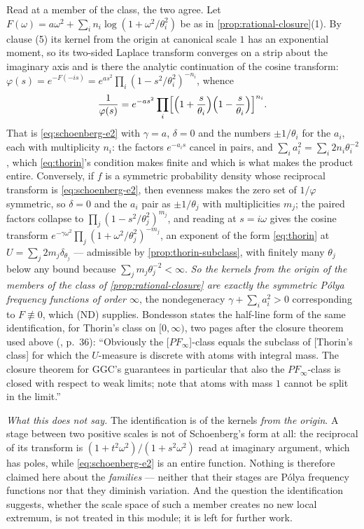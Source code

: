 \begin{remark}
Read at a member of the class, the two agree. Let $F(\omega) = a\omega^2 +
\sum_i n_i\log(1 + \omega^2/\theta_i^2)$ be as in \ref{prop:rational-closure}(1). By clause (5)
its kernel from the origin at canonical scale $1$ has an exponential moment, so its two-sided
Laplace transform converges on a strip about the imaginary axis and is there the analytic
continuation of the cosine transform: $\varphi(s) = e^{-F(-is)} = e^{as^2}\prod_i
(1 - s^2/\theta_i^2)^{-n_i}$, whence
\[
  \frac{1}{\varphi(s)}
   = e^{-as^2}\prod_i\Bigl[\Bigl(1 + \frac{s}{\theta_i}\Bigr)
       \Bigl(1 - \frac{s}{\theta_i}\Bigr)\Bigr]^{n_i} .
\]
That is \ref{eq:schoenberg-e2} with $\gamma = a$, $\delta = 0$ and the numbers $\pm1/\theta_i$ for
the $a_i$, each with multiplicity $n_i$: the factors $e^{-a_is}$ cancel in pairs, and
$\sum_i a_i^2 = \sum_i 2n_i\theta_i^{-2}$, which \ref{eq:thorin}'s condition makes finite and
which is what makes the product entire. Conversely, if $f$ is a symmetric probability density
whose reciprocal transform is \ref{eq:schoenberg-e2}, then evenness makes the zero set of
$1/\varphi$ symmetric, so $\delta = 0$ and the $a_i$ pair as $\pm1/\theta_j$ with multiplicities
$m_j$; the paired factors collapse to $\prod_j(1 - s^2/\theta_j^2)^{m_j}$, and reading at
$s = i\omega$ gives the cosine transform $e^{-\gamma\omega^2}\prod_j
(1+\omega^2/\theta_j^2)^{-m_j}$, an exponent of the form \ref{eq:thorin} at
$U = \sum_j 2m_j\delta_{\theta_j}$ --- admissible by \ref{prop:thorin-subclass}, with finitely
many $\theta_j$ below any bound because $\sum_j m_j\theta_j^{-2} < \infty$. \emph{So the kernels
from the origin of the members of the class of \ref{prop:rational-closure} are exactly the
symmetric P\'olya frequency functions of order $\infty$}, the nondegeneracy
$\gamma + \sum_ia_i^2 > 0$ corresponding to $F \not\equiv 0$, which (ND) supplies. Bondesson
states the half-line form of the same identification, for Thorin's class on $[0,\infty)$, two
pages after the closure theorem used above (, p.~36): ``Obviously
the [$PF_\infty$]-class equals the subclass of [Thorin's class] for which the $U$-measure is
discrete with atoms with integral mass. The closure theorem for GGC's guarantees in particular
that also the $PF_\infty$-class is closed with respect to weak limits; note that atoms with mass
$1$ cannot be split in the limit.''

\emph{What this does not say.} The identification is of the kernels \emph{from the origin}. A
stage between two positive scales is not of Schoenberg's form at all: the reciprocal of its
transform is $(1+t^2\omega^2)/(1+s^2\omega^2)$ read at imaginary argument, which has poles, while
\ref{eq:schoenberg-e2} is an entire function. Nothing is therefore claimed here about the
\emph{families} --- neither that their stages are P\'olya frequency functions nor that they
diminish variation. And the question the identification suggests, whether the scale space of such
a member creates no new local extremum, is not treated in this module; it is left for further
work.
\end{remark}

